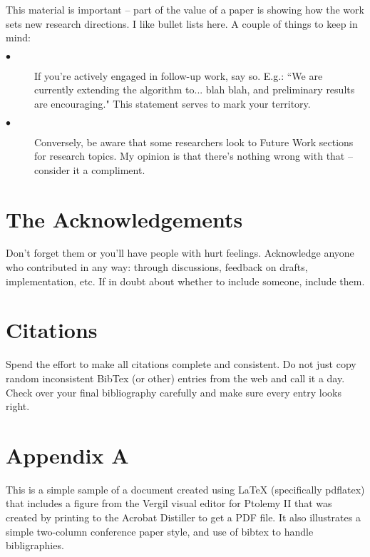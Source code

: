 \documentclass[10pt,twocolumn]{article}
\begin{document}
This material is important -- part of the value of a paper is showing how the work sets new research directions. I like bullet lists here. A couple of things to keep in mind:
\begin{description}
  \item[$\bullet$]  If you're actively engaged in follow-up work, say so. E.g.: ``We are currently extending the algorithm to... blah blah, and preliminary results are encouraging." This statement serves to mark your territory.
\item[$\bullet$]  Conversely, be aware that some researchers look to Future Work sections for research topics. My opinion is that there's nothing wrong with that -- consider it a compliment.
\end{description}

\section{The Acknowledgements}

Don't forget them or you'll have people with hurt feelings. Acknowledge anyone who contributed in any way: through discussions, feedback on drafts, implementation, etc. If in doubt about whether to include someone, include them.


\section{Citations}

Spend the effort to make all citations complete and consistent. Do not just copy random inconsistent BibTex (or other) entries from the web and call it a day. Check over your final bibliography carefully and make sure every entry looks right.

\section{Appendix A}
This is a simple sample of a document created using \LaTeX
   (specifically pdflatex) that includes a figure from the Vergil visual editor for Ptolemy II
   that was created by printing to the Acrobat Distiller to get a PDF file.
   It also illustrates a simple two-column conference paper style,
   and use of bibtex to handle bibligraphies.
\end{document}

